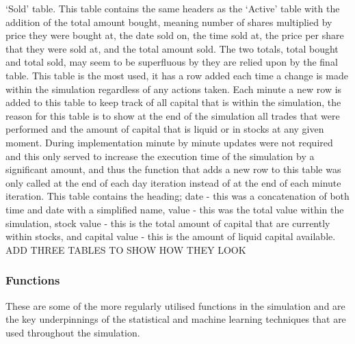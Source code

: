\documentclass[conference]{IEEEtran}
\begin{document}
`Sold' table. This table contains the same headers as the `Active' table with the addition of the total amount bought, meaning number of shares multiplied by price they were bought at, the date sold on, the time sold at, the price per share that they were sold at, and the total amount sold. The two totals, total bought and total sold, may seem to be superfluous by they are relied upon by the final table. This table is the most used, it has a row added each time a change is made within the simulation regardless of any actions taken. Each minute a new row is added to this table to keep track of all capital that is within the simulation, the reason for this table is to show at the end of the simulation all trades that were performed and the amount of capital that is liquid or in stocks at any given moment. During implementation minute by minute updates were not required and this only served to increase the execution time of the simulation by a significant amount, and thus the function that adds a new row to this table was only called at the end of each day iteration instead of at the end of each minute iteration. This table contains the heading; date - this was a concatenation of both time and date with a simplified name, value - this was the total value within the simulation, stock value - this is the total amount of capital that are currently within stocks, and capital value - this is the amount of liquid capital available. \\

ADD THREE TABLES TO SHOW HOW THEY LOOK\\
\fi

\subsubsection{Functions}

These are some of the more regularly utilised functions in the simulation and are the key underpinnings of the statistical and machine learning techniques that are used throughout the simulation. \\
\end{document}
